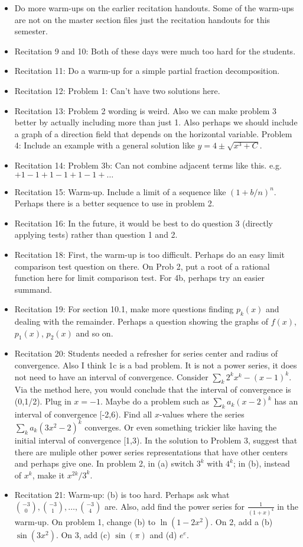 \documentclass{article}
\begin{document}
\large

\begin{itemize}
\item Do more warm-ups on the earlier recitation handouts. Some of the warm-ups are not on the master section files just the recitation handouts for this semester. 
\item Recitation 9 and 10: Both of these days were much too hard for the students. 
\item Recitation 11: Do a warm-up for a simple partial fraction decomposition.
\item Recitation 12: Problem 1: Can't have two solutions here.
\item Recitation 13: Problem 2 wording is weird. Also we can make problem 3 better by actually including more than just 1. Also perhaps we should include a graph of a direction field that depends on the horizontal variable. Problem 4: Include an example with a general solution like $y=4\pm \sqrt{x^3+C}$. 
\item Recitation 14: Problem 3b: Can not combine adjacent terms like this. e.g. $+1-1+1-1+1-1+\ldots$
\item Recitation 15: Warm-up. Include a limit of a sequence like $(1+b/n)^n$. Perhaps there is a better sequence to use in problem 2.
\item Recitation 16: In the future, it would be best to do question 3 (directly applying tests) rather than question 1 and 2.
\item Recitation 18: First, the warm-up is too difficult. Perhaps do an easy limit comparison test question on there. On Prob 2, put a root of a rational function here for limit comparison test. For 4b, perhaps try an easier summand. 
\item Recitation 19: For section 10.1, make more questions finding $p_k(x)$ and dealing with the remainder. Perhaps a question showing the graphs of $f(x)$, $p_1(x)$, $p_2(x)$ and so on.  
\item Recitation 20: Students needed a refresher for series center and radius of convergence. Also I think 1c is a bad problem. It is not a power series, it does not need to have an interval of convergence. Consider $\sum_k 2^k x^k - (x-1)^k$. Via the method here, you would conclude that the interval of convergence is (0,1/2). Plug in $x=-1$. Maybe do a problem such as $\sum_k a_k (x-2)^k$ has an interval of convergence [-2,6). Find all $x$-values where the series $\sum_k a_k (3x^2-2)^k$ converges. Or even something trickier like having the initial interval of convergence [1,3).  In the solution to Problem 3, suggest that there are muliple other power series representations that have other centers and perhaps give one. In problem 2, in (a) switch $3^k$ with $4^k$; in (b), instead of $x^k$, make it $x^{2k}/3^k$. 
\item Recitation 21: Warm-up: (b) is too hard. Perhaps ask what ${-3 \choose 0}, {-3 \choose 1}, \ldots, {-3\choose 4}$ are. Also, add find the power series for $\frac{1}{(1+x)^4}$ in the warm-up. On problem 1, change (b) to $\ln (1-2x^2)$. On 2, add a (b) $\sin(3x^2)$. On 3, add (c) $\sin (\pi)$ and (d) $e^e$. 
\end{itemize}
\end{document}
